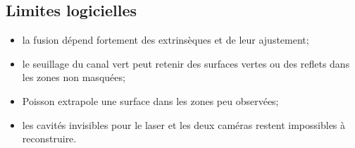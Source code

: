 \subsection{Limites logicielles}

\begin{itemize}
  \item la fusion dépend fortement des extrinsèques et de leur ajustement;
  \item le seuillage du canal vert peut retenir des surfaces vertes ou des
        reflets dans les zones non masquées;
  \item Poisson extrapole une surface dans les zones peu observées;
  \item les cavités invisibles pour le laser et les deux caméras restent
        impossibles à reconstruire.
\end{itemize}
